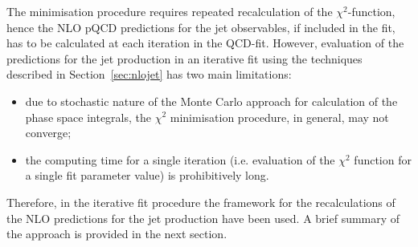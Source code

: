 The minimisation procedure requires repeated recalculation of the $\chi^2$-function, hence the NLO pQCD predictions for the jet observables, if included in the fit, has to be calculated at each iteration in the QCD-fit. However, evaluation of the predictions for the jet production in an iterative fit using the techniques described in Section~\ref{sec:nlojet} has two main limitations: 
\begin{itemize}
 \item due to stochastic nature of the Monte Carlo approach for calculation of the phase space integrals, the $\chi^2$ minimisation procedure,  in general, may not converge;
 \item the computing time for a single iteration (i.e. evaluation of the $\chi^2$ function for a single fit parameter value) is prohibitively long.
\end{itemize}
Therefore, in the iterative fit procedure the \fastnlo framework for the recalculations of the NLO predictions for the jet production have been used. A brief summary of the \fastnlo approach is provided in the next section. 
